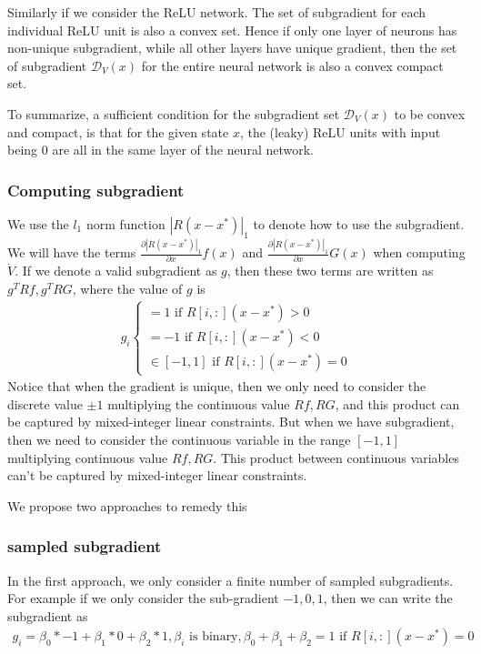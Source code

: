 \documentclass{article}
\begin{document}
Similarly if we consider the ReLU network. The set of subgradient for each individual ReLU unit is also a convex set. Hence if only one layer of neurons has non-unique subgradient, while all other layers have unique gradient, then the set of subgradient $\mathcal{D}_V(x)$ for the entire neural network is also a convex compact set.

To summarize, a sufficient condition for the subgradient set $\mathcal{D}_V(x)$ to be convex and compact, is that for the given state $x$, the (leaky) ReLU units with input being 0 are all in the same layer of the neural network.

\subsubsection{Computing subgradient}
We use the $l_1$ norm function $|R(x-x^*)|_1$ to denote how to use the subgradient. We will have the terms $\frac{\partial |R(x-x^*)|_1}{\partial x}f(x)$ and $\frac{\partial |R(x-x^*)|_1}{\partial x}G(x)$ when computing $\dot{V}$. If we denote a valid subgradient as $g$, then these two terms are written as $g^TRf, g^TRG$, where the value of $g$ is
\begin{align}
	g_i  \begin{cases}
		=1 \text{ if } R[i, :](x-x^*) > 0\\
		=-1 \text{ if } R[i, :](x-x^*) < 0\\
		\in[-1, 1] \text{ if } R[i, :](x-x^*)=0
	\end{cases}
\end{align}
Notice that when the gradient is unique, then we only need to consider the discrete value $\pm1$ multiplying the continuous value $Rf, RG$, and this product can be captured by mixed-integer linear constraints. But when we have subgradient, then we need to consider the continuous variable in the range $[-1, 1]$ multiplying continuous value $Rf, RG$. This product between continuous variables can't be captured by mixed-integer linear constraints.

We propose two approaches to remedy this
\subsubsection{sampled subgradient}
In the first approach, we only consider a finite number of sampled subgradients. For example if we only consider the sub-gradient $-1, 0, 1$, then we can write the subgradient as
\begin{align}
	g_i = \beta_0*-1+\beta_1 * 0 + \beta_2 * 1, \beta_i \text{ is binary}, \beta_0 + \beta_1 + \beta_2 = 1 \text{ if } R[i, :] (x-x^*)=0
\end{align}
\end{document}

